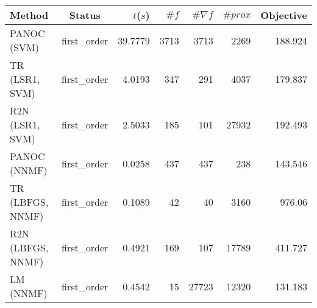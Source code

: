 \begin{tabular}{lcrrrrr}
  \hline
  \textbf{Method} & \textbf{Status} & \textbf{$t$($s$)} & \textbf{$\#f$} & \textbf{$\#\nabla f$} & \textbf{$\#prox$} & \textbf{Objective} \\\hline
  PANOC (SVM) & first\_order & 39.7779 & 3713 & 3713 & 2269 & 188.924 \\
  TR (LSR1, SVM) & first\_order & 4.0193 & 347 & 291 & 4037 & 179.837 \\
  R2N (LSR1, SVM) & first\_order & 2.5033 & 185 & 101 & 27932 & 192.493 \\
  PANOC (NNMF) & first\_order & 0.0258 & 437 & 437 & 238 & 143.546 \\
  TR (LBFGS, NNMF) & first\_order & 0.1089 & 42 & 40 & 3160 & 976.06 \\
  R2N (LBFGS, NNMF) & first\_order & 0.4921 & 169 & 107 & 17789 & 411.727 \\
  LM (NNMF) & first\_order & 0.4542 & 15 & 27723 & 12320 & 131.183 \\\hline
\end{tabular}
